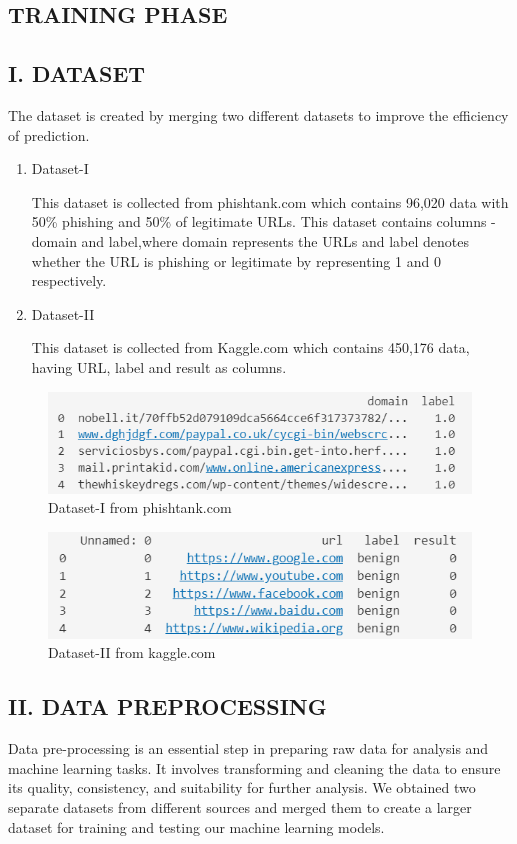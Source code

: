 \documentclass[conference]{IEEEtran}
\begin{document}
\subsection{TRAINING PHASE}

\subsection*{I. {\footnotesize DATASET}}
The dataset is created by merging two different datasets to improve the efficiency of prediction.
\begin{enumerate}
    \item Dataset-I
\par This dataset is collected from phishtank.com which contains 96,020 data with 50\% phishing and 50\% of legitimate URLs. This dataset contains columns - domain and label,where domain represents the URLs and label denotes whether the URL is phishing or legitimate by representing 1 and 0 respectively.
    
    \item Dataset-II
\par This dataset is collected from Kaggle.com which contains 450,176 data, having URL, label and result as columns.
\end{enumerate}
\begin{figure}[H]
\centerline{\includegraphics[scale=0.58]{dataset1.png}}
\caption{Dataset-I from phishtank.com}
\label{fig}
\end{figure}
\begin{figure}[H]
\centerline{\includegraphics[scale=0.6]{dataset2.png}}
\caption{Dataset-II from kaggle.com}
\label{fig}
\end{figure}


\subsection*{II. {\footnotesize DATA PREPROCESSING}}
Data pre-processing is an essential step in preparing raw data for analysis and machine learning tasks. It involves transforming and cleaning the data to ensure its quality, consistency, and suitability for further analysis.
We obtained two separate datasets from different sources and merged them to create a larger dataset for training and testing our machine learning models.
\end{document}
